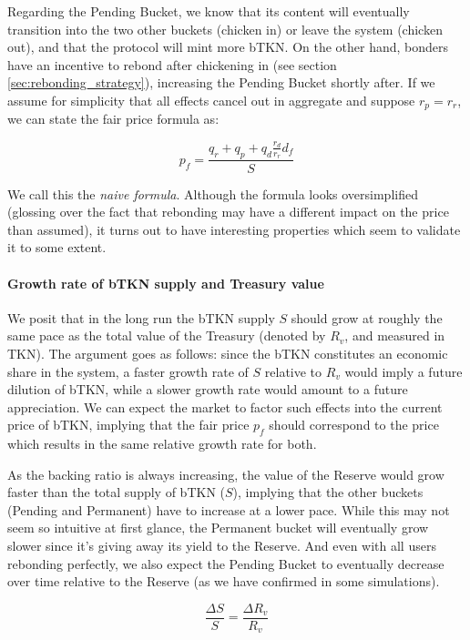 \documentclass{article}
\begin{document}
Regarding the Pending Bucket, we know that its content will eventually transition into the two other buckets (chicken in) or leave the system (chicken out), and that the protocol will mint more bTKN. On the other hand, bonders have an incentive to rebond after chickening in (see section \ref{sec:rebonding_strategy}), increasing the Pending Bucket shortly after. If we assume for simplicity that all effects cancel out in aggregate and suppose $r_p = r_r$, we can state the fair price formula as:

\begin{equation}
  \label{eq:naive-4}
   p_f = \frac{q_r + q_p + q_d \frac{r_d}{r_r} d_f}{S}
\end{equation}

We call this the \textit{naive formula}. Although the formula looks oversimplified (glossing over the fact that rebonding may have a different impact on the price than assumed), it turns out to have interesting properties which seem to validate it to some extent.

\paragraph{Growth rate of bTKN supply and Treasury value}
We posit that in the long run the bTKN supply $S$ should grow at roughly the same pace as the total value of the Treasury (denoted by $R_v$, and measured in TKN). The argument goes as follows: since the bTKN constitutes an economic share in the system, a faster growth rate of $S$ relative to $R_v$ would imply a future dilution of bTKN, while a slower growth rate would amount to a future appreciation. We can expect the market to factor such effects into the current price of bTKN, implying that the fair price $p_f$ should correspond to the price which results in the same relative growth rate for both.

As the backing ratio is always increasing, the value of the Reserve would grow faster than the total supply of bTKN ($S$), implying that the other buckets (Pending and Permanent) have to increase at a lower pace. While this may not seem so intuitive at first glance, the Permanent bucket will eventually grow slower since it's giving away its yield to the Reserve. And even with all users rebonding perfectly, we also expect the Pending Bucket to eventually decrease over time relative to the Reserve (as we have confirmed in some simulations).

\begin{equation}
  \label{eq:same_growth_rate}
  \frac{\Delta S}{S} = \frac{\Delta R_v}{R_v}
\end{equation}
\end{document}
